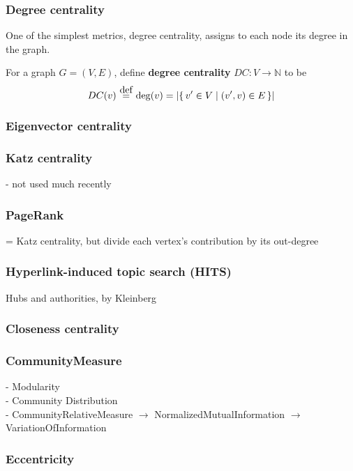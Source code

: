 \subsubsection{Degree centrality}

One of the simplest metrics, degree centrality, assigns to each node its degree in the graph.

\begin{definition}
    For a graph $G = (V, E)$, define \textbf{degree centrality} $DC : V \rightarrow \mathbb{N}$ to be
    \[ DC(v) \eqdef \deg(v) = \left| \Set{v' \in V}{(v', v) \in E} \right| \]
\end{definition}

\subsubsection{Eigenvector centrality}

\subsubsection{Katz centrality}
- not used much recently

\subsubsection{PageRank}
= Katz centrality, but divide each vertex's contribution by its out-degree

\subsubsection{Hyperlink-induced topic search (HITS)}
Hubs and authorities, by Kleinberg

\subsubsection{Closeness centrality}


\subsubsection{CommunityMeasure}
- Modularity\\
- Community Distribution\\
- CommunityRelativeMeasure $\rightarrow$ NormalizedMutualInformation $\rightarrow$ VariationOfInformation

\subsubsection{Eccentricity}

